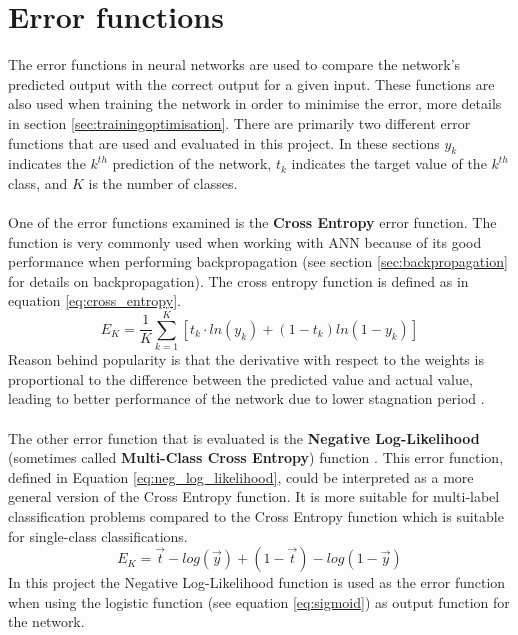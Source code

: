 \section{Error functions} \label{errorfunction}
The error functions in neural networks are used to compare the network's predicted output with the correct output for a given input. These functions are also used when training the network in order to minimise the error, more details in section \ref{sec:trainingoptimisation}. There are primarily two different error functions that are used and evaluated in this project. In these sections $y_k$ indicates the $k^{th}$ prediction of the network, $t_k$ indicates the target value of the $k^{th}$ class, and $K$ is the number of classes.
\\\\
One of the error functions examined is the \textbf{Cross Entropy} error function. The function is very commonly used when working with ANN because of its good performance when performing backpropagation (see section \ref{sec:backpropagation} for details on backpropagation). The cross entropy function is defined as in equation \ref{eq:cross_entropy}.
\begin{equation} \label{eq:cross_entropy}
    E_K = \frac{1}{K}\sum_{k=1}^{K} [t_k \cdot ln(y_k) +(1-t_k)ln(1-y_k) ]
\end{equation}
Reason behind popularity is that the derivative with respect to the weights is proportional to the difference between the predicted value and actual value, leading to better performance of the network due to lower stagnation period \parencite{nasr2002cross}.
\\\\
The other error function that is evaluated is the \textbf{Negative Log-Likelihood} (sometimes called \textbf{Multi-Class Cross Entropy}) function \parencite{bishop2006pattern}. This error function, defined in Equation \ref{eq:neg_log_likelihood}, could be interpreted as a more general version of the Cross Entropy function. It is more suitable for multi-label classification problems compared to the Cross Entropy function which is suitable for single-class classifications.
\begin{equation} \label{eq:neg_log_likelihood}
    E_K = \vec{t} -log(\vec{y}) + (1-\vec{t}) -log(1-\vec{y})
\end{equation}
In this project the Negative Log-Likelihood function is used as the error function when using the logistic function (see equation \ref{eq:sigmoid}) as output function for the network.

